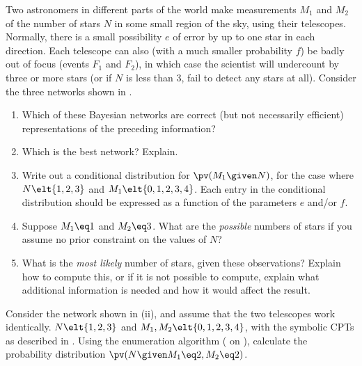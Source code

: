 \begin{exercise}
Two astronomers in different parts of the world make measurements
\(M_1\) and \(M_2\) of the number of stars \(N\) in some small region of the
sky, using their telescopes. Normally, there is a small possibility \(e\)
of error by up to one star in each direction. Each telescope can also (with a much
smaller probability \(f\)) be badly out of focus (events \(F_1\) and \(F_2\)), in
which case the scientist will undercount by three or more stars (or
if \(N\) is less than 3, fail to detect any stars at all). Consider
the three networks shown in .
\begin{enumerate}
\item Which of these Bayesian networks  are correct (but not
necessarily efficient) representations of the preceding
information? 

\item Which is the best network? Explain.

\item Write out a conditional distribution for \(\pv(M_1\given N)\),
for the case where \(N\elt\{1,2,3\}\) and \(M_1\elt\{0,1,2,3,4\}\).
Each entry in the conditional distribution should be expressed
as a function of the parameters \(e\) and/or \(f\).

\item Suppose \(M_1\eq 1\) and \(M_2\eq 3\). What are the {\em possible} numbers
of stars if you assume no prior constraint on the values of \(N\)?

\item What is the {\em most likely} number of stars, given these observations?  
Explain how to compute this, or if it is not possible to compute, explain what additional
information is needed and how it would affect the result.
\end{enumerate}
\end{exercise} 

\begin{uexercise}
Consider the network shown in (ii),
and assume that the two telescopes work identically.
\(N\elt\{1,2,3\}\) and \(M_1,M_2\elt\{0,1,2,3,4\}\),
with the symbolic CPTs as described in .
Using the enumeration algorithm ( on ), calculate the probability
distribution \(\pv(N\given M_1\eq 2,M_2\eq 2)\).
\end{uexercise} 

